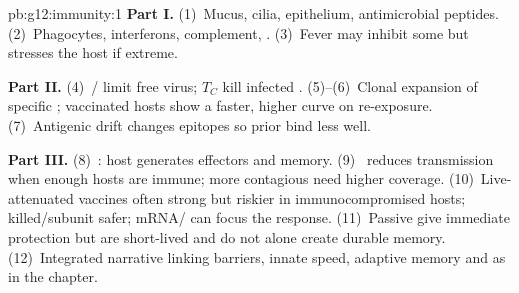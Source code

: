 \begin{solution}{pb:g12:immunity:1}
\textbf{Part I.} (1)~Mucus, cilia, epithelium, antimicrobial peptides.
(2)~Phagocytes, interferons, complement, . (3)~Fever may inhibit
some  but stresses the host if extreme.

\textbf{Part II.} (4)~/ limit free virus; $T_C$ kill infected
. (5)--(6)~Clonal expansion of specific ; vaccinated hosts show a
faster, higher   curve on re-exposure. (7)~Antigenic drift
changes epitopes so prior  bind less well.

\textbf{Part III.} (8)~: host generates effectors and memory.
(9)~ reduces transmission when enough hosts are immune; more
contagious  need higher coverage. (10)~Live-attenuated vaccines often
strong but riskier in immunocompromised hosts; killed/subunit safer;
mRNA/ can focus the response. (11)~Passive  give immediate
protection but are short-lived and do not alone create durable memory.
(12)~Integrated narrative linking barriers, innate speed, adaptive memory and
 as in the chapter.
\end{solution}
